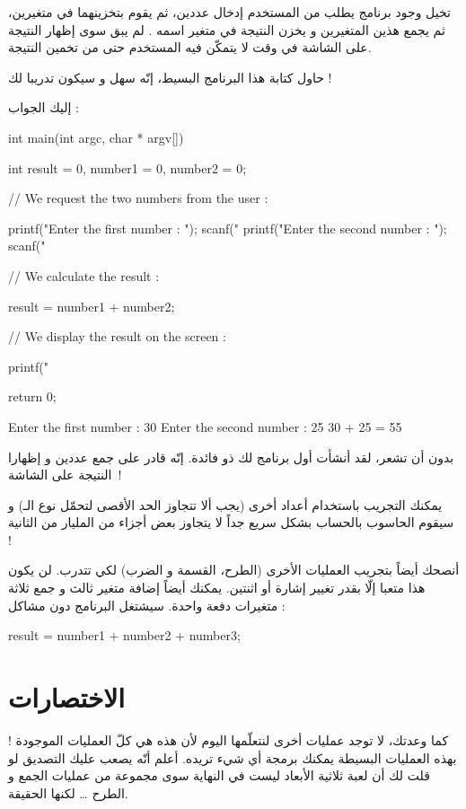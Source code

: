 تخيل وجود برنامج يطلب من المستخدم إدخال عددين، ثم يقوم بتخزينهما في متغيرين، ثم يجمع هذين المتغيرين و يخزن النتيجة في متغير اسمه
.
لم يبق سوى إظهار النتيجة على الشاشة في وقت لا يتمكّن فيه المستخدم حتى من تخمين النتيجة.

حاول كتابة هذا البرنامج البسيط، إنّه سهل و سيكون تدريبا لك !

إليك الجواب :

\begin{Csource}
int main(int argc, char * argv[])
{
  int result = 0, number1 = 0, number2 = 0;

  // We request the two numbers from the user :

  printf("Enter the first number : ");
  scanf("%
  printf("Enter the second number : ");
  scanf("%

  // We calculate the result :

  result = number1 + number2;

  // We display the result on the screen :

  printf("%

  return 0;
}
\end{Csource}

\begin{Console}
  Enter the first number : 30
  Enter the second number : 25
  30 + 25 = 55
\end{Console}

بدون أن تشعر، لقد أنشأت أول برنامج لك ذو فائدة. إنّه قادر على جمع عددين و إظهارا النتيجة على الشاشة~!

يمكنك التجريب باستخدام أعداد أخرى (يجب ألا تتجاوز الحد الأقصى لتحمّل نوع الـ)
و سيقوم الحاسوب بالحساب بشكل سريع جداً لا يتجاوز بعض أجزاء من المليار من الثانية !

أنصحك أيضاً بتجريب العمليات الأخرى (الطرح، القسمة و الضرب) لكي تتدرب. لن يكون هذا متعبا إلّا بقدر تغيير إشارة أو اثنتين. يمكنك أيضاً إضافة متغير ثالث و جمع ثلاثة متغيرات دفعة واحدة. سيشتغل البرنامج دون مشاكل :

\begin{Csource}
result = number1 + number2 + number3;
\end{Csource}

\section{الاختصارات}

كما وعدتك، لا توجد عمليات أخرى لنتعلّمها اليوم لأن هذه هي كلّ العمليات الموجودة ! بهذه العمليات البسيطة يمكنك برمجة أي شيء تريده. أعلم أنّه يصعب عليك التصديق لو قلت لك أن لعبة ثلاثية الأبعاد ليست في النهاية سوى مجموعة من عمليات الجمع و الطرح
\dots
لكنها الحقيقة.

